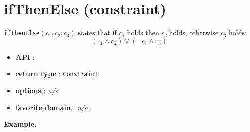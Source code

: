 \label{ifthenelse}
\hypertarget{ifthenelse}{}

\section{ifThenElse (constraint)}\label{ifthenelse:ifthenelseconstraint}\hypertarget{ifthenelse:ifthenelseconstraint}{}
\begin{notedef}
  \texttt{ifThenElse}$(c_1,c_2,c_3)$ states that if $c_1$ holds then $c_2$ holds, otherwise $c_3$ holds:
  $$(c_1\land c_2) \lor (\neg c_1 \land c_3)$$
\end{notedef}

\begin{itemize}
	\item \textbf{API} :
	\item \textbf{return type} : \texttt{Constraint}
	\item \textbf{options} : \emph{n/a}
	\item \textbf{favorite domain} : \emph{n/a}
\end{itemize}

\textbf{Example}:

